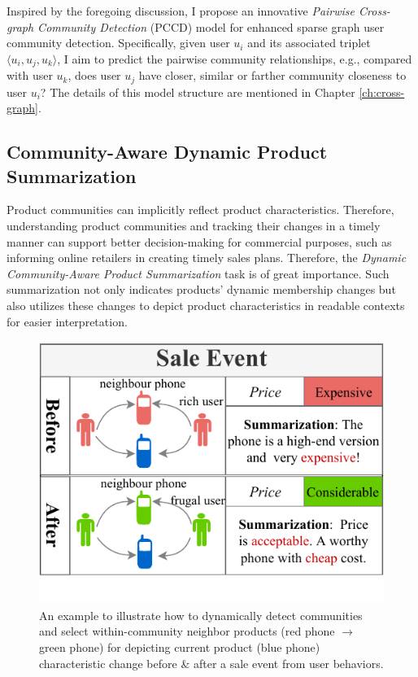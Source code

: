 Inspired by the foregoing discussion, I propose an innovative \textit{Pairwise Cross-graph Community Detection} (PCCD) model for enhanced sparse graph user community detection. Specifically, given user $u_i$ and its associated triplet $\langle u_{i},u_{j},u_{k}\rangle$, I aim to predict the pairwise community relationships, e.g., compared with user $u_{k}$, does user $u_{j}$ have closer, similar or farther community closeness to user $u_i$? The details of this model structure are mentioned in Chapter \ref{ch:cross-graph}.

\subsection{Community-Aware Dynamic Product Summarization}
Product communities can implicitly reflect product characteristics. Therefore, understanding product communities and tracking their changes in a timely manner can support better decision-making for commercial purposes, such as informing online retailers in creating timely sales plans. Therefore, the \textit{Dynamic Community-Aware Product Summarization} task is of great importance. Such summarization not only indicates products’ dynamic membership changes but also utilizes these changes to depict product characteristics in readable contexts for easier interpretation.

\begin{figure}  
	\centering
	\includegraphics[width=0.8\columnwidth]{img/chapter5/example.pdf}
	\caption{An example to illustrate how to dynamically detect communities and select within-community neighbor products (red phone $\rightarrow$ green phone) for depicting current product (blue phone) characteristic change before \& after a sale event from user behaviors.}
	\label{fig:c5_example}
\end{figure}

